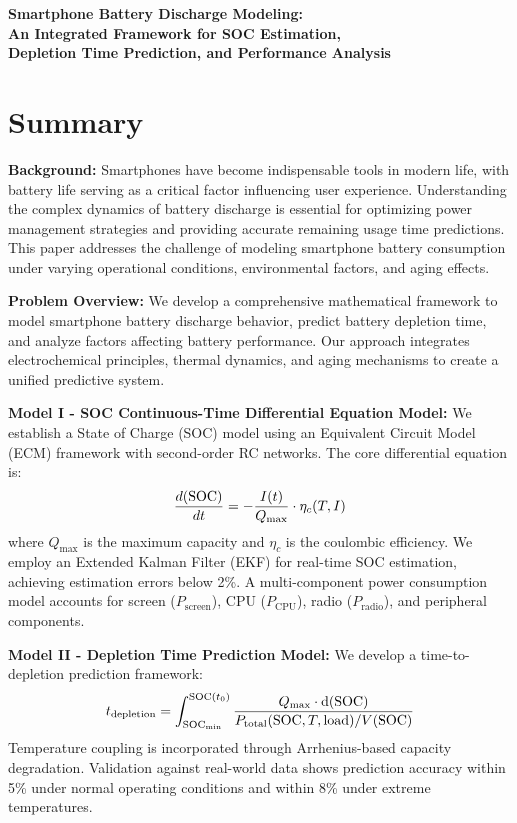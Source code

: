 \begin{center}
\textbf{\Large Smartphone Battery Discharge Modeling: \\
An Integrated Framework for SOC Estimation, \\
Depletion Time Prediction, and Performance Analysis}
\end{center}

\vspace{0.5cm}

\section*{Summary}

\textbf{Background:} Smartphones have become indispensable tools in modern life, with battery life serving as a critical factor influencing user experience. Understanding the complex dynamics of battery discharge is essential for optimizing power management strategies and providing accurate remaining usage time predictions. This paper addresses the challenge of modeling smartphone battery consumption under varying operational conditions, environmental factors, and aging effects.

\textbf{Problem Overview:} We develop a comprehensive mathematical framework to model smartphone battery discharge behavior, predict battery depletion time, and analyze factors affecting battery performance. Our approach integrates electrochemical principles, thermal dynamics, and aging mechanisms to create a unified predictive system.

\textbf{Model I - SOC Continuous-Time Differential Equation Model:} We establish a State of Charge (SOC) model using an Equivalent Circuit Model (ECM) framework with second-order RC networks. The core differential equation is:
\begin{equation*}
\frac{d(\text{SOC})}{dt} = -\frac{I(t)}{Q_{\max}} \cdot \eta_c(T, I)
\end{equation*}
where $Q_{\max}$ is the maximum capacity and $\eta_c$ is the coulombic efficiency. We employ an Extended Kalman Filter (EKF) for real-time SOC estimation, achieving estimation errors below 2\%. A multi-component power consumption model accounts for screen ($P_{\text{screen}}$), CPU ($P_{\text{CPU}}$), radio ($P_{\text{radio}}$), and peripheral components.

\textbf{Model II - Depletion Time Prediction Model:} We develop a time-to-depletion prediction framework:
\begin{equation*}
t_{\text{depletion}} = \int_{\text{SOC}_{\min}}^{\text{SOC}(t_0)} \frac{Q_{\max} \cdot \mathrm{d}(\text{SOC})}{P_{\text{total}}(\text{SOC}, T, \text{load})/V(\text{SOC})}
\end{equation*}
Temperature coupling is incorporated through Arrhenius-based capacity degradation. Validation against real-world data shows prediction accuracy within 5\% under normal operating conditions and within 8\% under extreme temperatures.

